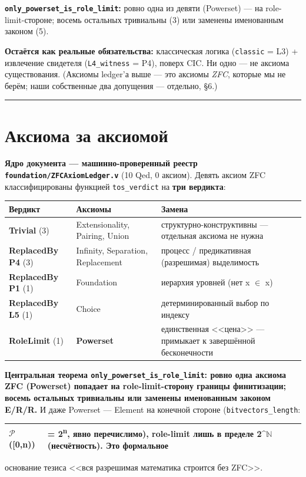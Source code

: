 \documentclass[11pt,a4paper]{article}
\begin{document}
\textbf{\texttt{only\_\allowbreak{}powerset\_\allowbreak{}is\_\allowbreak{}role\_\allowbreak{}limit}:} ровно одна из девяти (Powerset) --- на role-limit-стороне; восемь остальных тривиальны (3) или заменены именованным законом (5).

\textbf{Остаётся как реальные обязательства:} классическая логика (\texttt{classic} = L3) + извлечение свидетеля (\texttt{L4\_\allowbreak{}witness} = P4), поверх CIC. Ни одно --- не аксиома существования. (Аксиомы ledger'а выше --- это аксиомы \emph{ZFC}, которые мы не берём; наши собственные два допущения --- отдельно, \S{}6.)

\bigskip\hrule\bigskip

\section{Аксиома за аксиомой}

\textbf{Ядро документа --- машинно-проверенный реестр \texttt{foundation/\allowbreak{}ZFCAxiom\allowbreak{}Ledger.v}} (10 Qed, 0 аксиом). Девять аксиом ZFC классифицированы функцией \texttt{tos\_\allowbreak{}verdict} на \textbf{три вердикта}:

{\footnotesize\setlength{\tabcolsep}{4pt}\renewcommand{\arraystretch}{1.2}\begin{tabularx}{\linewidth}{|X|X|X|}
\hline
\textbf{Вердикт} & \textbf{Аксиомы} & \textbf{Замена} \\ \hline
\textbf{Trivial} (3) & Extensionality, Pairing, Union & структурно-конструктивны --- отдельная аксиома не нужна \\ \hline
\textbf{ReplacedBy P4} (3) & Infinity, Separation, Replacement & процесс / предикативная (разрешимая) выделимость \\ \hline
\textbf{ReplacedBy P1} (1) & Foundation & иерархия уровней (нет x $\in$ x) \\ \hline
\textbf{ReplacedBy L5} (1) & Choice & детерминированный выбор по индексу \\ \hline
\textbf{RoleLimit} (1) & \textbf{Powerset} & единственная <<цена>> --- примыкает к завершённой бесконечности \\ \hline
\end{tabularx}}

\textbf{Центральная теорема \texttt{only\_\allowbreak{}powerset\_\allowbreak{}is\_\allowbreak{}role\_\allowbreak{}limit}: ровно одна аксиома ZFC (Powerset) попадает на role-limit-сторону границы финитизации; восемь остальных тривиальны или заменены именованным законом E/R/R.} И даже Powerset --- Element на конечной стороне (\texttt{bitvectors\_\allowbreak{}length}:
{\footnotesize\setlength{\tabcolsep}{4pt}\renewcommand{\arraystretch}{1.2}\begin{tabularx}{\linewidth}{|X|X|}
\hline
\textbf{$\mathcal{P}$([0,n))} & \textbf{= 2\textsuperscript{n}, явно перечислимо), role-limit лишь в пределе 2\textasciicircum{}$\mathbb{N}$ (несчётность). Это формальное} \\ \hline
\end{tabularx}}
основание тезиса <<вся разрешимая математика строится без ZFC>>.
\end{document}
